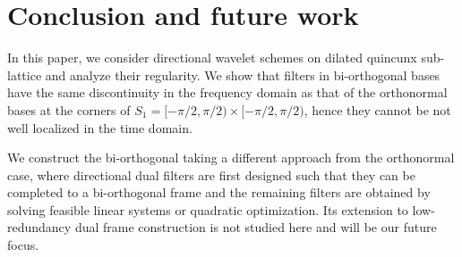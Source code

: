 \section{Conclusion and future work}\label{sec: end}
In this paper, we consider directional wavelet schemes on dilated quincunx sub-lattice and analyze their regularity. We show that filters in bi-orthogonal bases have the same discontinuity in the frequency domain as that of the orthonormal bases at the corners of $S_1 = [-\pi/2,\pi/2)\times[-\pi/2,\pi/2)$, hence they cannot be not well localized in the time domain. 

 We construct the bi-orthogonal taking a different approach from the orthonormal case, where directional dual filters are first designed such that they can be completed to a bi-orthogonal frame and the remaining filters are obtained by solving feasible linear systems or quadratic optimization. 
 Its extension to low-redundancy dual frame construction is not studied here and will be our future focus.